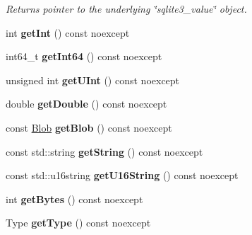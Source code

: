 \begin{DoxyCompactItemize}
\begin{DoxyCompactList}\small\item\em Returns pointer to the underlying \char`\"{}sqlite3\-\_\-value\char`\"{} object. \end{DoxyCompactList}\item 
\hypertarget{class_s_q_lite_1_1_value_a7dc198b9bcd56e1a00b4277d67e2fe94}{int {\bfseries get\-Int} () const noexcept}\label{class_s_q_lite_1_1_value_a7dc198b9bcd56e1a00b4277d67e2fe94}

\item 
\hypertarget{class_s_q_lite_1_1_value_afea7de5c78253675c70f1d4c49740e37}{int64\-\_\-t {\bfseries get\-Int64} () const noexcept}\label{class_s_q_lite_1_1_value_afea7de5c78253675c70f1d4c49740e37}

\item 
\hypertarget{class_s_q_lite_1_1_value_a196e4e06082b963730d766f99ccb3917}{unsigned int {\bfseries get\-U\-Int} () const noexcept}\label{class_s_q_lite_1_1_value_a196e4e06082b963730d766f99ccb3917}

\item 
\hypertarget{class_s_q_lite_1_1_value_a7976bd8973e60229f32d57d80b309eef}{double {\bfseries get\-Double} () const noexcept}\label{class_s_q_lite_1_1_value_a7976bd8973e60229f32d57d80b309eef}

\item 
\hypertarget{class_s_q_lite_1_1_value_a271c3d7f1de010f03197f5c72fd60d61}{const \hyperlink{class_s_q_lite_1_1_blob}{Blob} {\bfseries get\-Blob} () const noexcept}\label{class_s_q_lite_1_1_value_a271c3d7f1de010f03197f5c72fd60d61}

\item 
\hypertarget{class_s_q_lite_1_1_value_ae31b8ba26dec2668d11a49ad895e2267}{const std\-::string {\bfseries get\-String} () const noexcept}\label{class_s_q_lite_1_1_value_ae31b8ba26dec2668d11a49ad895e2267}

\item 
\hypertarget{class_s_q_lite_1_1_value_a693c71ee6c918f92e4378e91318a7694}{const std\-::u16string {\bfseries get\-U16\-String} () const noexcept}\label{class_s_q_lite_1_1_value_a693c71ee6c918f92e4378e91318a7694}

\item 
\hypertarget{class_s_q_lite_1_1_value_a03a193504f0c5fd751302a6ec8d01845}{int {\bfseries get\-Bytes} () const noexcept}\label{class_s_q_lite_1_1_value_a03a193504f0c5fd751302a6ec8d01845}

\item 
\hypertarget{class_s_q_lite_1_1_value_ac43f7a22f87464aceaef9855e9700ff7}{Type {\bfseries get\-Type} () const noexcept}\label{class_s_q_lite_1_1_value_ac43f7a22f87464aceaef9855e9700ff7}


\end{DoxyCompactItemize}
